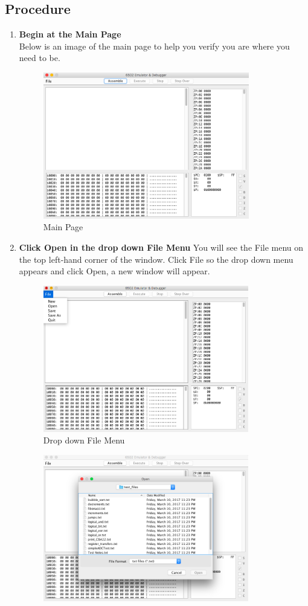\documentclass[a3paper, 11pt]{article}
\newlength{\drop}
\begin{document}
\subsection{Procedure}
\begin{enumerate}
	\item \textbf{Begin at the Main Page}\\
	Below is an image of the main page to help you verify you are where you need to be.
	\begin{figure}[h!]
		\centering
			\includegraphics[width=9cm, height=6.4cm]{MainPage}
			\caption{Main Page}
	\end{figure}
	\clearpage
	\item \textbf{Click Open in the drop down File Menu}
	You will see the File menu on the top left-hand corner of the window. Click File so the drop down menu appears and click Open, a new window will appear. 
	\begin{figure}[h!]
		\centering
			\includegraphics[width=9cm, height=6.4cm]{FileMenu}
			\caption{Drop down File Menu}
	\end{figure}
	\begin{figure}[h!]
		\centering
		\includegraphics[width=9cm, height=6.4cm]{OpenFile}

\end{figure}
\end{enumerate}
\end{document}
